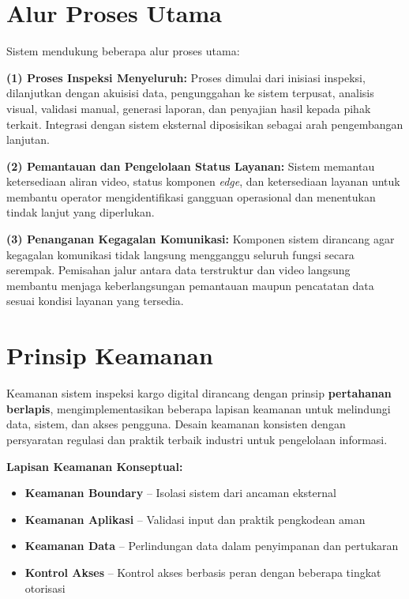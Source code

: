 \section{Alur Proses Utama}

Sistem mendukung beberapa alur proses utama:

\textbf{(1) Proses Inspeksi Menyeluruh:} Proses dimulai dari inisiasi inspeksi, dilanjutkan dengan akuisisi data, pengunggahan ke sistem terpusat, analisis visual, validasi manual, generasi laporan, dan penyajian hasil kepada pihak terkait. Integrasi dengan sistem eksternal diposisikan sebagai arah pengembangan lanjutan.

\textbf{(2) Pemantauan dan Pengelolaan Status Layanan:} Sistem memantau ketersediaan aliran video, status komponen \textit{edge}, dan ketersediaan layanan untuk membantu operator mengidentifikasi gangguan operasional dan menentukan tindak lanjut yang diperlukan.

\textbf{(3) Penanganan Kegagalan Komunikasi:} Komponen sistem dirancang agar kegagalan komunikasi tidak langsung mengganggu seluruh fungsi secara serempak. Pemisahan jalur antara data terstruktur dan video langsung membantu menjaga keberlangsungan pemantauan maupun pencatatan data sesuai kondisi layanan yang tersedia.

\section{Prinsip Keamanan}

Keamanan sistem inspeksi kargo digital dirancang dengan prinsip \textbf{pertahanan berlapis}, mengimplementasikan beberapa lapisan keamanan untuk melindungi data, sistem, dan akses pengguna. Desain keamanan konsisten dengan persyaratan regulasi dan praktik terbaik industri untuk pengelolaan informasi.

\textbf{Lapisan Keamanan Konseptual:}
\begin{itemize}
  \item \textbf{Keamanan Boundary} -- Isolasi sistem dari ancaman eksternal
  \item \textbf{Keamanan Aplikasi} -- Validasi input dan praktik pengkodean aman
  \item \textbf{Keamanan Data} -- Perlindungan data dalam penyimpanan dan pertukaran
  \item \textbf{Kontrol Akses} -- Kontrol akses berbasis peran dengan beberapa tingkat otorisasi
\end{itemize}

